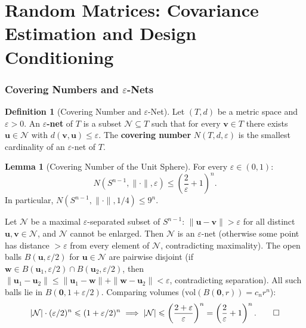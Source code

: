 \documentclass[12pt,a4paper]{article}
\makeatletter
\theoremstyle{definition}
\newtheorem{definition}[theorem]{Definition}
\newtheorem{lemma}[theorem]{Lemma}
\renewenvironment{proof}[1][\proofname]{\par
  \pushQED{\qed}%
  \normalfont \topsep6\p@\@plus6\p@\relax
  \trivlist
  \item[\hskip\labelsep\bfseries #1\@addpunct{.}]\ignorespaces
}{%
  \popQED\endtrivlist\@endpefalse
}
\newcommand{\bzero}{\mathbf{0}}
\newcommand{\bw}{\mathbf{w}}
\newcommand{\bv}{\mathbf{v}}
\newcommand{\bu}{\mathbf{u}}
\newcommand{\calN}{\mathcal{N}}
\makeatother
\begin{document}
\newpage
\part{Random Matrices: Covariance Estimation and Design Conditioning}\label{part:random-matrices}

\section{Covering Numbers and \texorpdfstring{$\varepsilon$}{epsilon}-Nets}\label{sec:covering}

\begin{definition}[Covering Number and $\varepsilon$-Net]\label{def:covering}
Let $(T, d)$ be a metric space and $\varepsilon > 0$. An \textbf{$\varepsilon$-net} of $T$ is a subset $\calN \subseteq T$ such that for every $\bv \in T$ there exists $\bu \in \calN$ with $d(\bv, \bu) \leqslant \varepsilon$. The \textbf{covering number} $N(T, d, \varepsilon)$ is the smallest cardinality of an $\varepsilon$-net of $T$.
\end{definition}

\begin{lemma}[Covering Number of the Unit Sphere]\label{lem:covering-sphere}
For every $\varepsilon \in (0, 1)$:
\begin{equation}\label{eq:covering-sphere}
N(S^{n-1}, \|\cdot\|, \varepsilon) \leqslant \left(\frac{2}{\varepsilon} + 1\right)^n.
\end{equation}
In particular, $N(S^{n-1}, \|\cdot\|, 1/4) \leqslant 9^n$.
\end{lemma}

\begin{proof}
Let $\calN$ be a maximal $\varepsilon$-separated subset of $S^{n-1}$: $\|\bu - \bv\| > \varepsilon$ for all distinct $\bu, \bv \in \calN$, and $\calN$ cannot be enlarged. Then $\calN$ is an $\varepsilon$-net (otherwise some point has distance $> \varepsilon$ from every element of $\calN$, contradicting maximality). The open balls $B(\bu, \varepsilon/2)$ for $\bu \in \calN$ are pairwise disjoint (if $\bw \in B(\bu_1, \varepsilon/2) \cap B(\bu_2, \varepsilon/2)$, then $\|\bu_1 - \bu_2\| \leqslant \|\bu_1 - \bw\| + \|\bw - \bu_2\| < \varepsilon$, contradicting separation). All such balls lie in $B(\bzero, 1 + \varepsilon/2)$. Comparing volumes ($\mathrm{vol}(B(\bzero, r)) = c_n r^n$):
\[
|\calN| \cdot (\varepsilon/2)^n \leqslant (1 + \varepsilon/2)^n \implies |\calN| \leqslant \left(\frac{2 + \varepsilon}{\varepsilon}\right)^n = \left(\frac{2}{\varepsilon} + 1\right)^n. \qedhere
\]
\end{proof}
\end{document}
